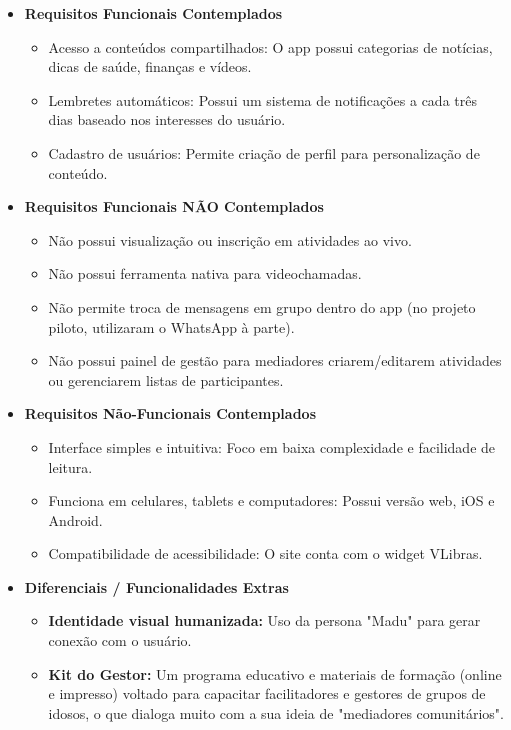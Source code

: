 \begin{itemize}
    \item \textbf{Requisitos Funcionais Contemplados}
        \begin{itemize}
            \item Acesso a conteúdos compartilhados: O app possui categorias de notícias, dicas de saúde, finanças e vídeos.
            \item Lembretes automáticos: Possui um sistema de notificações a cada três dias baseado nos interesses do usuário.
            \item Cadastro de usuários: Permite criação de perfil para personalização de conteúdo.
        \end{itemize}
    \item \textbf{Requisitos Funcionais NÃO Contemplados}
        \begin{itemize}
            \item Não possui visualização ou inscrição em atividades ao vivo.
            \item Não possui ferramenta nativa para videochamadas.
            \item Não permite troca de mensagens em grupo dentro do app (no projeto piloto, utilizaram o WhatsApp à parte).
            \item Não possui painel de gestão para mediadores criarem/editarem atividades ou gerenciarem listas de participantes.
        \end{itemize}
    \item \textbf{Requisitos Não-Funcionais Contemplados}
        \begin{itemize}
            \item Interface simples e intuitiva: Foco em baixa complexidade e facilidade de leitura.
            \item Funciona em celulares, tablets e computadores: Possui versão web, iOS e Android.
            \item Compatibilidade de acessibilidade: O site conta com o widget VLibras.
        \end{itemize}
    \item \textbf{Diferenciais / Funcionalidades Extras}
        \begin{itemize}
            \item \textbf{Identidade visual humanizada:} Uso da persona "Madu" para gerar conexão com o usuário.
            \item \textbf{Kit do Gestor:} Um programa educativo e materiais de formação (online e impresso) voltado para capacitar facilitadores e gestores de grupos de idosos, o que dialoga muito com a sua ideia de "mediadores comunitários".
        \end{itemize}
\end{itemize}

